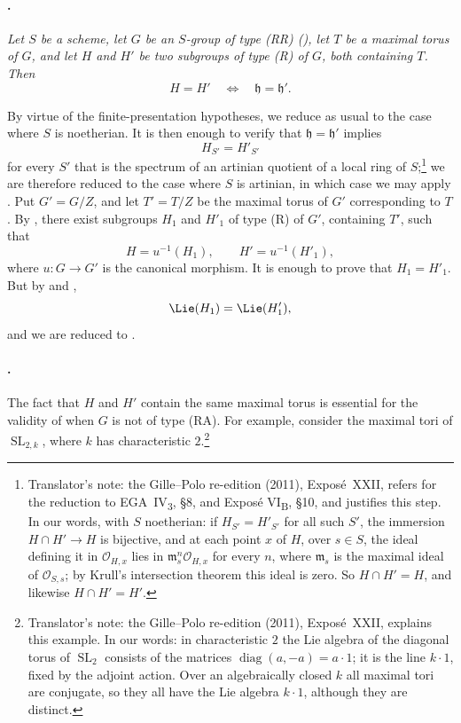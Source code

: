 \paragraph{.}
\textit{Let \(S\) be a scheme, let \(G\) be an \(S\)-group of type
\textup{(RR)} \textup{()}, let \(T\) be a maximal torus of
\(G\), and let \(H\) and \(H'\) be two subgroups of type
\textup{(R)} of \(G\), both containing \(T\). Then}
\[
  H=H'
  \quad\Longleftrightarrow\quad
  \mathfrak h=\mathfrak h'.
\]

By virtue of the finite-presentation hypotheses, we reduce as usual
to the case where \(S\) is noetherian.
It is then enough to verify that
\(\mathfrak h=\mathfrak h'\) implies
\[
  H_{S'}=H'_{S'}
\]
for every \(S'\) that is the spectrum of an artinian quotient of a
local ring of \(S\);\footnote{Translator's note: the Gille--Polo re-edition (2011), Exposé~XXII, refers
for the reduction to EGA~IV\textsubscript{3}, \S8, and Exposé
VI\textsubscript{B}, \S10, and justifies this step. In our words, with \(S\)
noetherian: if \(H_{S'}=H'_{S'}\) for all such \(S'\), the immersion
\(H\cap H'\to H\) is bijective, and at each point \(x\) of \(H\), over
\(s\in S\), the ideal defining it in \(\mathcal O_{H,x}\) lies in
\(\mathfrak m_s^n\mathcal O_{H,x}\) for every \(n\), where \(\mathfrak m_s\) is
the maximal ideal of \(\mathcal O_{S,s}\); by Krull's intersection theorem
this ideal is zero. So \(H\cap H'=H\), and likewise \(H\cap H'=H'\).} we are
therefore reduced to the case where \(S\) is artinian, in which case we may apply .
Put \(G'=G/Z\), and let \(T'=T/Z\) be the maximal torus
of \(G'\) corresponding to \(T\). By , there exist
subgroups \(H_1\) and \(H'_1\) of type \textup{(R)} of \(G'\),
containing \(T'\), such that
\[
  H=u^{-1}(H_1),
  \qquad
  H'=u^{-1}(H'_1),
\]
where \(u:G\to G'\) is the canonical morphism. It is enough to prove
that \(H_1=H'_1\). But by  and ,
\[
  \Lie(H_1)=\Lie(H'_1),
\]
and we are reduced to .

\paragraph{.}
The fact that \(H\) and \(H'\) contain the same maximal torus is
essential for the validity of  when \(G\) is not of type
\textup{(RA)}. For example, consider the maximal tori of
\(\operatorname{SL}_{2,k}\), where \(k\) has characteristic
\(2\).\footnote{Translator's note: the Gille--Polo re-edition (2011), Exposé~XXII, explains
this example. In our words: in characteristic \(2\) the Lie algebra of the
diagonal torus of \(\operatorname{SL}_2\) consists of the matrices
\(\operatorname{diag}(a,-a)=a\cdot1\); it is the line \(k\cdot1\), fixed by the
adjoint action. Over an algebraically closed \(k\) all maximal tori are
conjugate, so they all have the Lie algebra \(k\cdot1\), although they are
distinct.}

